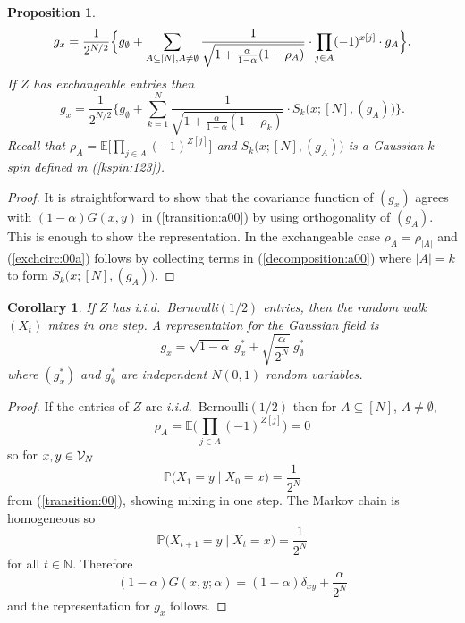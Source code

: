 \documentclass[preprint,11pt]{elsarticle}
\newtheorem{Corollary}{Corollary}
\newtheorem{Proposition}{Proposition}
\theoremstyle{remark}
\def\iid{\emph{i.i.d.}~}
\begin{document}
{\begin{Proposition}
\begin{equation}
g_x = \frac{1}{2^{N/2}}\Big \{g_\emptyset 
+ \sum_{A\subseteq [N], A \ne \emptyset} \frac{1}{\sqrt{1 + \frac{\alpha}{1-\alpha}(1-\rho_A)}}
\cdot \prod_{j\in A}(-1)^{x[j]}\cdot g_A\Big \}
 \label{decomposition:a00}.\\
\end{equation}
If $Z$ has exchangeable entries then
\begin{equation}
g_x
=  \frac{1}{2^{N/2}}\Big \{g_\emptyset +
\sum_{k=1}^{N}
 \frac {1}{\sqrt{1 + \frac{\alpha}{1-\alpha}(1-\rho_k)}}
\cdot S_k\big (x;[N],(g_A)\big )
\Big \}.
\label{exchcirc:00a}
\end{equation}
Recall that $\rho_A = \mathbb{E}\big [\prod_{j\in A}(-1)^{Z[j]}\big ]$
and $S_k\big (x;[N],(g_A)\big )$ is a Gaussian $k$-spin defined in (\ref{kspin:123}).
\end{Proposition}
%
\begin{proof}
It is straightforward to show that the covariance function of $(g_x)$ agrees with $(1-\alpha)G(x,y)$ 
in (\ref{transition:a00}) by using orthogonality of $(g_A)$. This is enough to show the representation.
 In the exchangeable case $\rho_A = \rho_{|A|}$ and (\ref{exchcirc:00a}) follows by collecting terms in 
(\ref{decomposition:a00}) where $|A|=k$ to form $S_k\big (x;[N],(g_A)\big )$.
%
\end{proof}
%
\begin{Corollary} \label{ziidb}
If $Z$ has \iid Bernoulli$(1/2)$ entries, then the random walk $(X_t)$ mixes in one step.
A representation for the Gaussian field is 
\[
g_x %
= \sqrt{1-\alpha}\ g^\ast_x +  \sqrt{ \frac{\alpha}{2^N}}\ g_\emptyset^\ast
\]
where $(g^\ast_x)$  and $g^\ast_\emptyset$ are independent $N(0,1)$ random variables.
\end{Corollary}
\begin{proof}
If the entries of $Z$ are \iid Bernoulli$(1/2)$ then for $A\subseteq [N]$, $A\ne \emptyset$,
\[
\rho_A = \mathbb{E}\big (\prod_{j\in A}(-1)^{Z[j]}\big ) = 0
\]
so for $x,y \in {\cal V}_N$ 
\[
\mathbb{P}\big (X_{1} = y\mid X_0 = x\big ) = \frac{1}{2^N}
\]
from (\ref{transition:00}), showing mixing in one step. The Markov chain is homogeneous so 
\[
\mathbb{P}\big (X_{t+1} = y\mid X_t = x\big ) = \frac{1}{2^N}
\]
for all $t\in \mathbb{N}$.
Therefore
\begin{equation*}
(1-\alpha)G(x,y;\alpha) = (1-\alpha)\delta_{xy}  + \frac{\alpha}{2^N}
\label{temp:465}
\end{equation*}
and the representation for $g_x$ follows.
\end{proof}

}
\end{document}
